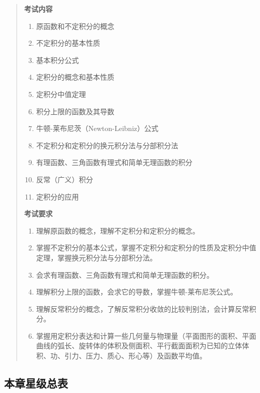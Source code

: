 \documentclass[11pt,openany,UTF8]{ctexbook}
\begin{document}
\begin{quote}
\textbf{考试内容}

\begin{enumerate}
\item 原函数和不定积分的概念
\item 不定积分的基本性质
\item 基本积分公式
\item 定积分的概念和基本性质
\item 定积分中值定理
\item 积分上限的函数及其导数
\item 牛顿-莱布尼茨（Newton-Leibniz）公式
\item 不定积分和定积分的换元积分法与分部积分法
\item 有理函数、三角函数有理式和简单无理函数的积分
\item 反常（广义）积分
\item 定积分的应用
\end{enumerate}
\textbf{考试要求}

\begin{enumerate}
\item 理解原函数的概念，理解不定积分和定积分的概念。
\item 掌握不定积分的基本公式，掌握不定积分和定积分的性质及定积分中值定理，掌握换元积分法与分部积分法。
\item 会求有理函数、三角函数有理式和简单无理函数的积分。
\item 理解积分上限的函数，会求它的导数，掌握牛顿-莱布尼茨公式。
\item 理解反常积分的概念，了解反常积分收敛的比较判别法，会计算反常积分。
\item 掌握用定积分表达和计算一些几何量与物理量（平面图形的面积、平面曲线的弧长、旋转体的体积及侧面积、平行截面面积为已知的立体体积、功、引力、压力、质心、形心等）及函数平均值。
\end{enumerate}
\end{quote}
\subsection*{本章星级总表}
\end{document}
